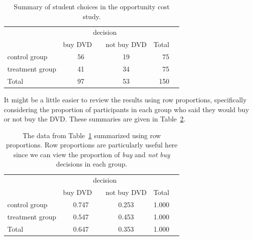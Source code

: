 \begin{table}[ht]
\centering
\begin{tabular}{l cc rr}
& \multicolumn{2}{c}{decision} \\
\cline{2-3}
				& {buy DVD}\ \  	& {not buy DVD} & Total & \hspace{3mm}  \\ 
\cline{1-4}
control group 		& 56		& 19	& 75 \\ 
treatment group 	& 41		& 34	& 75 \\ 
\cline{1-4}
Total				& 97		& 53	& 150
\end{tabular}
\caption{Summary of student choices in the opportunity cost study.}
\label{OpportunityCostTable}
\end{table}

It might be a little easier to review the results using row proportions, specifically considering the proportion of participants in each group who said they would buy or not buy the DVD. These summaries are given in Table~\ref{OpportunityCostTableRowProp}.

\begin{table}[ht]
\centering
\begin{tabular}{l cc rr}
& \multicolumn{2}{c}{decision} \\
\cline{2-3}
				& {buy DVD}\ \  	& {not buy DVD} & Total & \hspace{3mm}  \\ 
\cline{1-4}
control group 		& 0.747	& 0.253	& 1.000 \\ 
treatment group 	& 0.547	& 0.453	& 1.000 \\ 
\cline{1-4}
Total				& 0.647	& 0.353	& 1.000
\end{tabular}
\caption{The data from Table~\ref{OpportunityCostTable} summarized using row proportions. Row proportions are particularly useful here since we can view the proportion of \emph{buy} and \emph{not buy} decisions in each group.}
\label{OpportunityCostTableRowProp}
\end{table}

